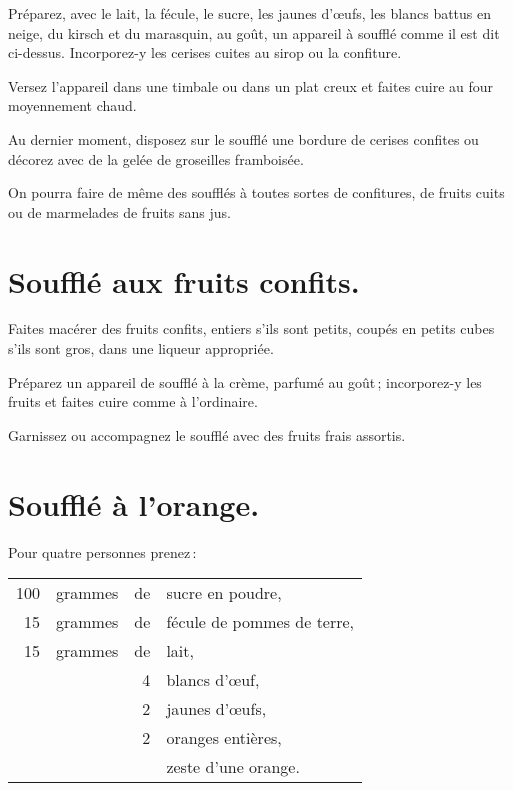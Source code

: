Préparez, avec le lait, la fécule, le sucre, les jaunes d'œufs, les blancs battus
en neige, du kirsch et du marasquin, au goût, un appareil à soufflé comme il est
dit ci-dessus. Incorporez-y les cerises cuites au sirop ou la confiture.

Versez l'appareil dans une timbale ou dans un plat creux et faites cuire au four
moyennement chaud.

Au dernier moment, disposez sur le soufflé une bordure de cerises confites ou
décorez avec de la gelée de groseilles framboisée.

\sk

On pourra faire de même des soufflés à toutes sortes de confitures, de fruits
cuits ou de marmelades de fruits sans jus.

\section*{\centering Soufflé aux fruits confits.}
{}

Faites macérer des fruits confits, entiers s'ils sont petits, coupés en petits cubes
s'ils sont gros, dans une liqueur appropriée.

Préparez un appareil de soufflé à la crème, parfumé au goût ; incorporez-y les
fruits et faites cuire comme à l'ordinaire.

Garnissez ou accompagnez le soufflé avec des fruits frais assortis.

\section*{\centering Soufflé à l'orange.}
{}

Pour quatre personnes prenez :

\footnotesize
\begin{longtable}{rrrp{16em}}
    100 & grammes & de & sucre en poudre,                                                                 \\
     15 & grammes & de & fécule de pommes de terre,                                                       \\
     15 & grammes & de & lait,                                                                            \\
        &         &  4 & blancs d'œuf,                                                                    \\
        &         &  2 & jaunes d'œufs,                                                                   \\
        &         &  2 & oranges entières,                                                                \\
        &         &    & zeste d'une orange.                                                              \\
\end{longtable}
\normalsize

